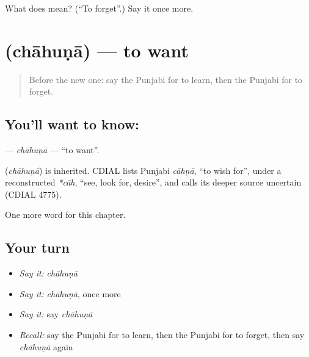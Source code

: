 \begin{tcolorbox}[breakable,colback=teal!4,colframe=teal!35!black,title={Before you move on}]
What does  mean? (\textquotedblleft{}To forget\textquotedblright{}.) Say it once more.
\end{tcolorbox}
\section[\texorpdfstring{\pa{ਚਾਹੁਣਾ} (chāhuṇā)}{ਚਾਹੁਣਾ (chāhuṇā)}]{ (chāhuṇā) — to want}

\label{lesson:PA-C60-chahuna}



\begin{quote}
Before the new one: say the Punjabi for to learn, then the Punjabi for to forget.
\end{quote}

\subsection*{You'll want to know: }
\textbf{} — \emph{chāhuṇā} — \textquotedblleft{}to want\textquotedblright{}.

\begin{cousinweb}
\textbf{} (\emph{chāhuṇā}) is inherited. CDIAL lists Punjabi \emph{cāhṇā}, \textquotedblleft{}to wish for\textquotedblright{}, under a reconstructed \emph{*cāh}, \textquotedblleft{}see, look for, desire\textquotedblright{}, and calls its deeper source uncertain (CDIAL 4775).
\end{cousinweb}

\begin{grammarlens}[title={What you've built}]
One more word for this chapter.
\end{grammarlens}

\subsection*{Your turn}
\begin{itemize}
\raggedright
  \item \emph{Say it:} \emph{chāhuṇā}
  \item \emph{Say it:} \emph{chāhuṇā}, once more
  \item \emph{Say it:} say \emph{chāhuṇā}
  \item \emph{Recall:} say the Punjabi for to learn, then the Punjabi for to forget, then say \emph{chāhuṇā} again
\end{itemize}

